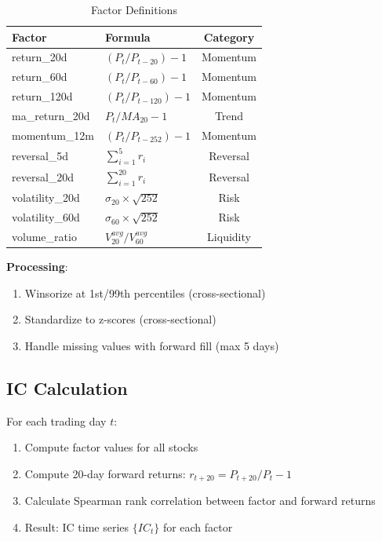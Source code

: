 \begin{table}[h]
\centering
\caption{Factor Definitions}
\begin{tabular}{llc}
\toprule
Factor & Formula & Category \\
\midrule
return\_20d & $(P_t / P_{t-20}) - 1$ & Momentum \\
return\_60d & $(P_t / P_{t-60}) - 1$ & Momentum \\
return\_120d & $(P_t / P_{t-120}) - 1$ & Momentum \\
ma\_return\_20d & $P_t / MA_{20} - 1$ & Trend \\
momentum\_12m & $(P_t / P_{t-252}) - 1$ & Momentum \\
\midrule
reversal\_5d & $\sum_{i=1}^{5} r_i$ & Reversal \\
reversal\_20d & $\sum_{i=1}^{20} r_i$ & Reversal \\
\midrule
volatility\_20d & $\sigma_{20} \times \sqrt{252}$ & Risk \\
volatility\_60d & $\sigma_{60} \times \sqrt{252}$ & Risk \\
\midrule
volume\_ratio & $V_{20}^{avg} / V_{60}^{avg}$ & Liquidity \\
\bottomrule
\end{tabular}
\end{table}

\textbf{Processing}:
\begin{enumerate}
    \item Winsorize at 1st/99th percentiles (cross-sectional)
    \item Standardize to z-scores (cross-sectional)
    \item Handle missing values with forward fill (max 5 days)
\end{enumerate}

\subsection{IC Calculation}

For each trading day $t$:

\begin{enumerate}
    \item Compute factor values for all stocks
    \item Compute 20-day forward returns: $r_{t+20} = P_{t+20}/P_t - 1$
    \item Calculate Spearman rank correlation between factor and forward returns
    \item Result: IC time series $\{IC_t\}$ for each factor
\end{enumerate}

